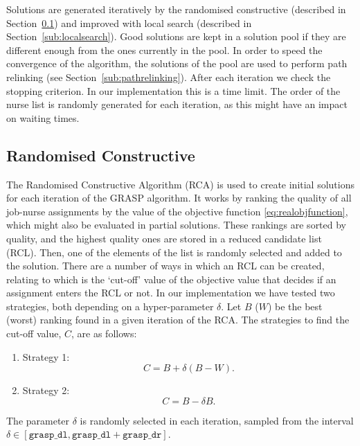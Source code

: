 \documentclass[a4paper,11pt,authoryear]{elsarticle}
\begin{document}
\noindent Solutions are generated iteratively by the randomised constructive (described in Section~\ref{sub:randomisedconstructive}) and improved with local search (described in Section~\ref{sub:localsearch}). Good solutions are kept in a solution pool if they are different enough from the ones currently in the pool. In order to speed the convergence of the algorithm, the solutions of the pool are used to perform path relinking (see Section~\ref{sub:pathrelinking}). After each iteration we check the stopping criterion. In our implementation this is a time limit. The order of the nurse list is randomly generated for each iteration, as this might have an impact on waiting times. 

\subsection{Randomised Constructive}
\label{sub:randomisedconstructive}
\noindent The Randomised Constructive Algorithm (RCA) is used to create initial solutions for each iteration of the GRASP algorithm. It works by ranking the quality of all job-nurse assignments by the value of the objective function \eqref{eq:realobjfunction}, which might also be evaluated in partial solutions. These rankings are sorted by quality, and the highest quality ones are stored in a reduced candidate list (RCL). Then, one of the elements of the list is randomly selected and added to the solution. There are a number of ways in which an RCL can be created, relating to which is the `cut-off' value of the objective value that decides if an assignment enters the RCL or not. In our implementation we have tested two strategies, both depending on a hyper-parameter $\delta$. Let $B$ ($W$) be the best (worst) ranking found in a given iteration of the RCA. The strategies to find the cut-off value, $C$, are as follows:
\begin{enumerate}[label={(\arabic*)}]
     \item Strategy 1:
     \begin{equation}
         C = B + \delta (B - W). \label{eq:rcastrategy1}
     \end{equation}
     \item Strategy 2:
     \begin{equation}
         C = B - \delta B. \label{eq:rcastrategy2}
     \end{equation}
 \end{enumerate} 
The parameter $\delta$ is randomly selected in each iteration, sampled from the interval $\delta \in [\texttt{grasp\_dl}, \texttt{grasp\_dl} + \texttt{grasp\_dr}]$.
\end{document}
